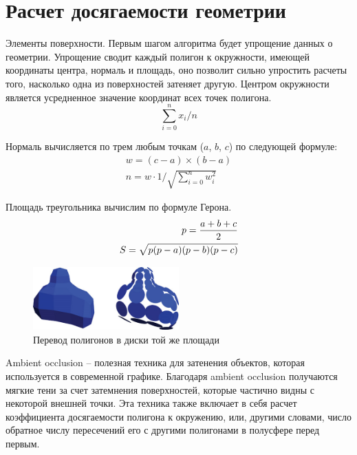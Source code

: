\clearpage

\section{Расчет досягаемости геометрии}\label{main_part}

Элементы поверхности. Первым шагом алгоритма будет упрощение данных о геометрии. Упрощение сводит каждый полигон к окружности, имеющей координаты центра, нормаль и площадь, оно позволит сильно упростить расчеты того, насколько одна из поверхностей затеняет другую. Центром окружности является усредненное значение координат всех точек полигона.
\begin{equation}
	\sum_{i=0}^{n} x_i / n
\end{equation}

Нормаль вычисляется по трем любым точкам ($a$, $b$, $c$) по следующей формуле:
\begin{equation}\begin{split}
	w = {(c-a) \times (b-a)} \\
	n = w \cdot 1 / \sqrt{\sum_{i=0}^{n} {w_i^2}}
\end{split}\end{equation}

Площадь треугольника вычислим по формуле Герона.
\begin{equation}\begin{split}
	p= {{a+b+c}\over{2}} \\
	S=\sqrt{p(p-a)(p-b)(p-c)}
\end{split}\end{equation}

\begin{figure}[h]
	\center
	\includegraphics[width=0.5\textwidth]{14_ambient_occlusion_02}
	\caption{Перевод полигонов в диски той же площади}\label{fig:ao02}
\end{figure}
Ambient occlusion -- полезная техника для затенения объектов, которая используется в современной графике. Благодаря ambient occlusion получаются мягкие тени за счет затемнения поверхностей, которые частично видны с некоторой внешней точки. Эта техника также включает в себя расчет коэффициента досягаемости полигона к окружению, или, другими словами, число обратное числу пересечений его с другими полигонами в полусфере перед первым.


